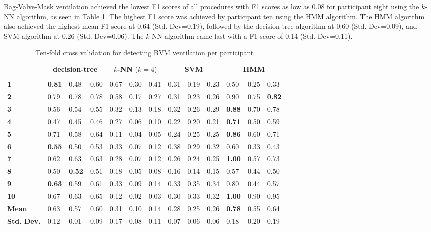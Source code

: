 \par Bag-Valve-Mask ventilation achieved the lowest F1 scores of all procedures with F1 scores as low as 0.08 for participant eight using the $k$-NN algorithm, as seen in Table \ref{tab:bvm:ml}. The highest F1 score was achieved by participant ten using the HMM algorithm. The HMM algorithm also achieved the highest mean F1 score at 0.64 (Std. Dev=0.19), followed by the decision-tree algorithm at 0.60 (Std. Dev=0.09), and SVM algorithm at 0.26 (Std. Dev=0.06). The $k$-NN algorithm came last with a F1 score of 0.14 (Std. Dev=0.11).
\begin{table}[h]
	\centering
	\begin{tabular}{lllllllllllll}
		\multirow{2}{*}{\rotatebox[origin=c]{45}{\textbf{Participant}}}& \multicolumn{3}{c}{\textbf{decision-tree}} & \multicolumn{3}{c}{\textbf{$k$-NN} ($k=4$)} & \multicolumn{3}{c}{\textbf{SVM}} & \multicolumn{3}{c}{\textbf{HMM}} \\
		& \rot{Precision}     & \rot{Recall}    & \rot{F1}    & \rot{Precision}     & \rot{Recall}    & \rot{F1}  & \rot{Precision}     & \rot{Recall}    & \rot{F1} & \rot{Precision}     & \rot{Recall}    & \rot{F1} \\
		\textbf{1}   & \textbf{0.81} & 0.48 & 0.60 & 0.67 & 0.30 & 0.41 & 0.31 & 0.19 & 0.23 & 0.50 & 0.25 & 0.33 \\
		\textbf{2}   & 0.79 & 0.78 & 0.78 & 0.58 & 0.17 & 0.27 & 0.31 & 0.23 & 0.26 & 0.90 & 0.75 & \textbf{0.82} \\
		\textbf{3}   & 0.56 & 0.54 & 0.55 & 0.32 & 0.13 & 0.18 & 0.32 & 0.26 & 0.29 & \textbf{0.88} & 0.70 & 0.78 \\
		\textbf{4}   & 0.47 & 0.45 & 0.46 & 0.27 & 0.06 & 0.10 & 0.22 & 0.20 & 0.21 & \textbf{0.71} & 0.50 & 0.59 \\
		\textbf{5}   & 0.71 & 0.58 & 0.64 & 0.11 & 0.04 & 0.05 & 0.24 & 0.25 & 0.25 & \textbf{0.86} & 0.60 & 0.71 \\
		\textbf{6}   & \textbf{0.55} & 0.50 & 0.53 & 0.33 & 0.07 & 0.12 & 0.38 & 0.29 & 0.32 & 0.60 & 0.33 & 0.43 \\
		\textbf{7}   & 0.62 & 0.63 & 0.63 & 0.28 & 0.07 & 0.12 & 0.26 & 0.24 & 0.25 & \textbf{1.00} & 0.57 & 0.73 \\
		\textbf{8}   & 0.50 & \textbf{0.52} & 0.51 & 0.18 & 0.05 & 0.08 & 0.16 & 0.14 & 0.15 & 0.57 & 0.44 & 0.50 \\
		\textbf{9}   & \textbf{0.63} & 0.59 & 0.61 & 0.33 & 0.09 & 0.14 & 0.33 & 0.35 & 0.34 & 0.80 & 0.44 & 0.57 \\
		\textbf{10} & 0.67 & 0.63 & 0.65 & 0.12 & 0.02 & 0.03 & 0.30 & 0.33 & 0.32 & \textbf{1.00} & 0.90 & 0.95 \\
		\hline
		\textbf{Mean} & 0.63 & 0.57 & 0.60 & 0.31 & 0.10 & 0.14 & 0.28 & 0.25 & 0.26 & \textbf{0.78} & 0.55 & 0.64 \\
		\textbf{Std. Dev.} & 0.12 & 0.01 & 0.09 & 0.17 & 0.08 & 0.11 & 0.07 & 0.06 & 0.06 & 0.18 & 0.20 & 0.19
	\end{tabular}
	\caption{Ten-fold cross validation for detecting BVM ventilation per participant}
	\label{tab:bvm:ml}
\end{table}

